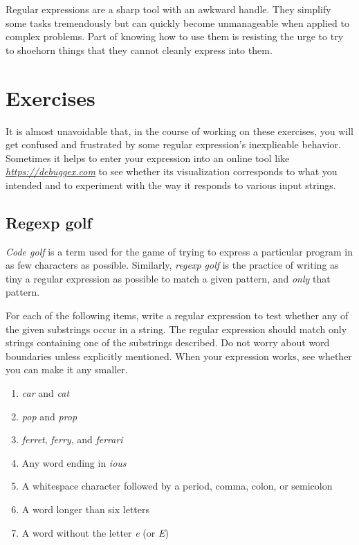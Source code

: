 Regular expressions are a sharp tool with an awkward handle. They simplify some tasks tremendously but can quickly become unmanageable when applied to complex problems. Part of knowing how to use them is resisting the urge to try to shoehorn things that they cannot cleanly express into them.

\section{Exercises}

It is almost unavoidable that, in the course of working on these exercises, you will get confused and frustrated by some regular expression's inexplicable behavior. Sometimes it helps to enter your expression into an online tool like \href{https://www.debuggex.com/}{\emph{https://debuggex.com}} to see whether its visualization corresponds to what you intended and to experiment with the way it responds to various input strings.

\subsection{Regexp golf}

\emph{Code golf} is a term used for the game of trying to express a particular program in as few characters as possible. Similarly, \emph{regexp golf} is the practice of writing as tiny a regular expression as possible to match a given pattern, and \emph{only} that pattern.

For each of the following items, write a regular expression to test whether any of the given substrings occur in a string. The regular expression should match only strings containing one of the substrings described. Do not worry about word boundaries unless explicitly mentioned. When your expression works, see whether you can make it any smaller.

\begin{enumerate}
\item 

\emph{car} and \emph{cat}
\item 

\emph{pop} and \emph{prop}
\item 

\emph{ferret}, \emph{ferry}, and \emph{ferrari}
\item 

Any word ending in \emph{ious}
\item 

A whitespace character followed by a period, comma, colon, or semicolon
\item 

A word longer than six letters
\item 

A word without the letter \emph{e} (or \emph{E})
\end{enumerate}

